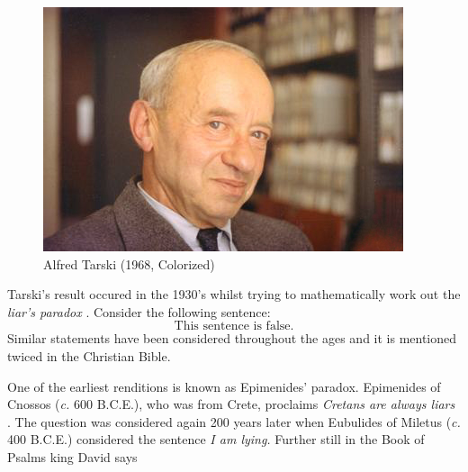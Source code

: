         \begin{minipage}[c]{0.49\textwidth}
            \centering
            \begin{figure}[H]
                \centering
                \captionsetup{type=figure}
                \if{}
                    \includegraphics[scale=0.4]{photos/AlfredTarski1968.jpeg}
                \fi
                \caption{Alfred Tarski (1968, Colorized)}
                \label{photo:Alfred_Tarski}
            \end{figure}
        \end{minipage}
        \hfill
        \begin{minipage}[c]{0.49\textwidth}
            Tarski's result occured in the 1930's whilst trying to
            mathematically work out the
            \textit{liar's paradox}
            \cite{TarskiUndefinability}. Consider the following sentence:
            \begin{equation}
                \text{This sentence is false.}
            \end{equation}
            Similar statements have been considered throughout the ages and
            it is mentioned twiced in the Christian Bible.
        \end{minipage}
        \par\vspace{2.5ex}
        One of the earliest renditions is known as Epimenides'
        paradox.
        Epimenides of Cnossos (\textit{c.} 600 B.C.E.), who was from Crete,
        proclaims \textit{Cretans are always liars} \cite{KingJamesBible}. The
        question was considered again 200 years later when Eubulides of Miletus
        (\textit{c.} 400 B.C.E.) considered the sentence \textit{I am lying.}
        Further still in the Book of Psalms king David says
